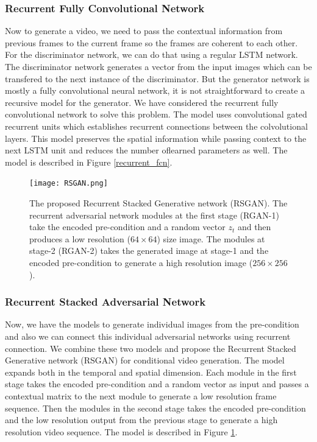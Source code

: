 \documentclass{article}
\begin{document}
\subsubsection{Recurrent Fully Convolutional Network}
Now to generate a video, we need to pass the contextual information from previous frames to the current frame so the frames are coherent to each other. For the discriminator network, we can do that using a regular LSTM network. The discriminator network generates a vector from the input images which can be transfered to the next instance of the discriminator. But the generator network is mostly a fully convolutional neural network, it is not straightforward to create a recursive model for the generator. We have considered the recurrent fully convolutional network \cite{rFCN} to solve this problem. The model uses convolutional gated recurrent units which establishes recurrent connections between the colvolutional layers. This model preserves the spatial information while passing context to the next LSTM unit and reduces the number oflearned parameters as well. The model is described in Figure \ref{recurrent_fcn}.

\begin{figure}[h]

  \centering
  \texttt{[image: RSGAN.png]} 
  \caption{The proposed Recurrent Stacked Generative network (RSGAN). The recurrent adversarial network modules at the first stage (RGAN-1) take the encoded pre-condition and a random vector $z_t$ and then produces a low resolution ($64 \times 64$) size image. The modules at stage-2 (RGAN-2) takes the generated image at stage-1 and the encoded pre-condition to generate a high resolution image ($256 \times 256$).}
    \label{RSGAN}
\end{figure}

\subsubsection{Recurrent Stacked Adversarial Network}
Now, we have the models to generate individual images from the pre-condition and also we can connect this individual adversarial networks using recurrent connection. We combine these two models and propose the Recurrent Stacked Generative network (RSGAN) for conditional video generation. The model expands both in the temporal and spatial dimension. Each module in the first stage takes the encoded pre-condition and a random vector as input and passes a contextual matrix to the next module to generate a low resolution frame sequence. Then the modules in the second stage takes the encoded pre-condition and the low resolution output from the previous stage to generate a high resolution video sequence. The model is described in Figure \ref{RSGAN}.
\end{document}
